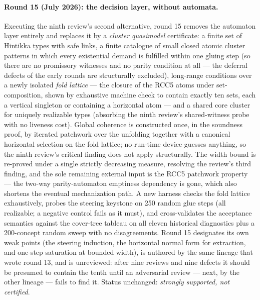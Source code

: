 \documentclass[
]{ceurart}
\theoremstyle{definition}
\begin{document}
\paragraph{Round 15 (July 2026): the decision layer, without automata.}
Executing the ninth review's second alternative, round 15 removes the
automaton layer entirely and replaces it by a \emph{cluster quasimodel}
certificate: a finite set of Hintikka types with safe links, a finite
catalogue of small closed atomic cluster patterns in which every
existential demand is fulfilled within one gluing step (so there are no
promissory witnesses and no parity condition at all --- the deferral
defects of the early rounds are structurally excluded), long-range
conditions over a newly isolated \emph{fold lattice} --- the closure of
the RCC5 atoms under set-composition, shown by exhaustive machine check
to contain exactly ten sets, each a vertical singleton or containing a
horizontal atom --- and a shared core cluster for uniquely realizable
types (absorbing the ninth review's shared-witness probe with no
liveness cost).  Global coherence is constructed once, in the soundness
proof, by iterated patchwork over the unfolding together with a
canonical horizontal selection on the fold lattice; no run-time device
guesses anything, so the ninth review's critical finding does not apply
structurally.  The width bound is re-proved under a single strictly
decreasing measure, resolving the review's third finding, and the sole
remaining external input is the RCC5 patchwork property --- the two-way
parity-automaton emptiness dependency is gone, which also shortens the
eventual mechanization path.  A new harness checks the fold lattice
exhaustively, probes the steering keystone on 250 random glue steps
(all realizable; a negative control fails as it must), and
cross-validates the acceptance semantics against the cover-tree tableau
on all eleven historical diagnostics plus a 200-concept random sweep
with no disagreements.  Round 15 designates its own weak points (the
steering induction, the horizontal normal form for extraction, and
one-step saturation at bounded width), is authored by the same lineage
that wrote round 13, and is unreviewed: after nine reviews and nine
defects it should be presumed to contain the tenth until an adversarial
review --- next, by the other lineage --- fails to find it.  Status
unchanged: \emph{strongly supported, not certified}.
\end{document}
